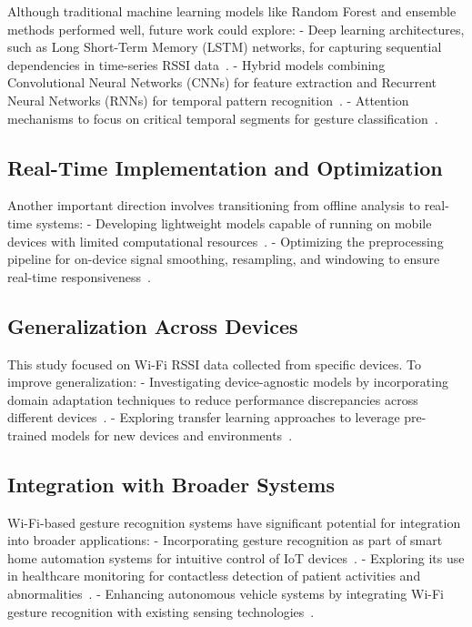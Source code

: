 \documentclass[10pt,twocolumn,letterpaper]{article}
\begin{document}
Although traditional machine learning models like Random Forest and ensemble methods performed well, future work could explore:
- Deep learning architectures, such as Long Short-Term Memory (LSTM) networks, for capturing sequential dependencies in time-series RSSI data~\cite{haseeb2020wisture}.
- Hybrid models combining Convolutional Neural Networks (CNNs) for feature extraction and Recurrent Neural Networks (RNNs) for temporal pattern recognition~\cite{wang2017wifi}.
- Attention mechanisms to focus on critical temporal segments for gesture classification~\cite{vaswani2017attention}.

\subsection{Real-Time Implementation and Optimization}

Another important direction involves transitioning from offline analysis to real-time systems:
- Developing lightweight models capable of running on mobile devices with limited computational resources~\cite{abdelnasser2015wifi}.
- Optimizing the preprocessing pipeline for on-device signal smoothing, resampling, and windowing to ensure real-time responsiveness~\cite{haseeb2020wisture}.

\subsection{Generalization Across Devices}

This study focused on Wi-Fi RSSI data collected from specific devices. To improve generalization:
- Investigating device-agnostic models by incorporating domain adaptation techniques to reduce performance discrepancies across different devices~\cite{wang2017wifi}.
- Exploring transfer learning approaches to leverage pre-trained models for new devices and environments~\cite{pan2010survey}.

\subsection{Integration with Broader Systems}

Wi-Fi-based gesture recognition systems have significant potential for integration into broader applications:
- Incorporating gesture recognition as part of smart home automation systems for intuitive control of IoT devices~\cite{wang2017wifi}.
- Exploring its use in healthcare monitoring for contactless detection of patient activities and abnormalities~\cite{abdelnasser2015wifi}.
- Enhancing autonomous vehicle systems by integrating Wi-Fi gesture recognition with existing sensing technologies~\cite{wang2017wifi}.
\end{document}
